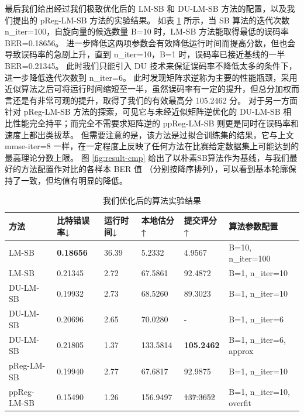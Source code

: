\documentclass[withoutpreface,bwprint]{cumcmthesis}
\begin{document}
最后我们给出经过我们极致优化后的 LM-SB 和 DU-LM-SB 方法的配置，以及我们提出的 pReg-LM-SB 方法的实验结果。
如表 \ref{tbl:result} 所示，当 SB 算法的迭代次数 n\_iter=100，自旋向量的候选数量 B=10 时，LM-SB 方法能取得最低的误码率 BER=0.18656。
进一步降低这两项参数会有效降低运行时间而提高分数，但也会导致误码率的急剧上升，直到 n\_iter=10，B=1 时，误码率已接近基线的一半 BER=0.21345。
此时我们只能引入 DU 技术来保证误码率不降低太多的条件下，进一步降低迭代次数到 n\_iter=6。
此时发现矩阵求逆称为主要的性能瓶颈，采用近似算法之后可将运行时间缩短至一半，虽然误码率有一定的提升，但总分加权而言还是有非常可观的提升，取得了我们的有效最高分 105.2462 分。
对于另一方面针对 pReg-LM-SB 方法的探索，可见它与未经近似矩阵逆优化的 DU-LM-SB 相比性能完全持平；而完全不需要求矩阵逆的 ppReg-LM-SB 则更是同时在误码率和速度上都出类拔萃。
但需要注意的是，该方法是过拟合训练集的结果，它与上文 mmse-iter=8 一样，在一定程度上反映了任何方法在比赛给定数据集上可能达到的最高理论分数上限。
图 \ref{fig:result-cmp} 给出了以朴素SB算法作为基线，与我们最好的方法配置作对比的各样本 BER 值 （分别按降序排列），可以看到基本轮廓保持了一致，但均值有明显的降低。

\begin{table}[h!]
	\centering
	\caption{我们优化后的算法实验结果}
	\begin{tabular}{llllll}
		\textbf{方法} & \textbf{比特错误率↓} & \textbf{运行时间↓} & \textbf{本地估分↑} & \textbf{提交评分↑} & \textbf{算法参数配置} \\
		\hline
		LM-SB & \textbf{0.18656} &  36.39 &  5.2332 &  4.9567 & B=10, n\_iter=100 \\
		LM-SB & 0.21345 & 2.72 & 67.5861 & 92.4872 & B=1, n\_iter=10 \\
		DU-LM-SB & 0.19932 & 2.73 & 68.5260 & 89.3023 & B=1, n\_iter=10 \\
		DU-LM-SB & 0.20696 & 2.65 & 70.0280 & - & B=1, n\_iter=6 \\
		DU-LM-SB & 0.21805 & 1.37 & 133.5814 & \textbf{105.2462} & B=1, n\_iter=6, approx \\
		pReg-LM-SB & 0.19940 & 2.77 & 67.6817 & 92.9875 & B=1, n\_iter=10 \\
		ppReg-LM-SB & 0.15490 & 1.26 & 156.9497 & \sout{137.3652} & B=1, n\_iter=10, overfit \\
	\end{tabular}
	\label{tbl:result}
\end{table}
\end{document}
